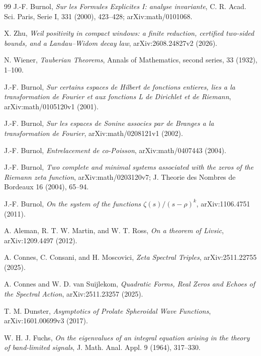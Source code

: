 \documentclass[11pt]{article}
\theoremstyle{remark}
\begin{document}
\begin{thebibliography}{99}
\small
\setlength{\itemsep}{2pt}
J.-F. Burnol,
\emph{Sur les Formules Explicites I: analyse invariante},
C. R. Acad. Sci. Paris, Serie I, 331 (2000), 423--428;
arXiv:math/0101068.

X. Zhu,
\emph{Weil positivity in compact windows: a finite reduction,
certified two-sided bounds, and a Landau--Widom decay law},
arXiv:2608.24827v2 (2026).

N. Wiener,
\emph{Tauberian Theorems},
Annals of Mathematics, second series, 33 (1932), 1--100.

J.-F. Burnol,
\emph{Sur certains espaces de Hilbert de fonctions entieres, lies a la transformation de Fourier et aux fonctions L de Dirichlet et de Riemann},
arXiv:math/0105120v1 (2001).

J.-F. Burnol,
\emph{Sur les espaces de Sonine associes par de Branges a la transformation de Fourier},
arXiv:math/0208121v1 (2002).

J.-F. Burnol,
\emph{Entrelacement de co-Poisson},
arXiv:math/0407443 (2004).

J.-F. Burnol,
\emph{Two complete and minimal systems associated with the zeros of the Riemann zeta function},
arXiv:math/0203120v7; J. Theorie des Nombres de Bordeaux 16 (2004), 65--94.

J.-F. Burnol,
\emph{On the system of the functions $\zeta(s)/(s-\rho)^k$},
arXiv:1106.4751 (2011).

A. Aleman, R. T. W. Martin, and W. T. Ross,
\emph{On a theorem of Livsic},
arXiv:1209.4497 (2012).

A. Connes, C. Consani, and H. Moscovici,
\emph{Zeta Spectral Triples},
arXiv:2511.22755 (2025).

A. Connes and W. D. van Suijlekom,
\emph{Quadratic Forms, Real Zeros and Echoes of the Spectral Action},
arXiv:2511.23257 (2025).

T. M. Dunster,
\emph{Asymptotics of Prolate Spheroidal Wave Functions},
arXiv:1601.00699v3 (2017).

W. H. J. Fuchs,
\emph{On the eigenvalues of an integral equation arising in the theory of band-limited signals},
J. Math. Anal. Appl. 9 (1964), 317--330.


\end{thebibliography}
\end{document}
